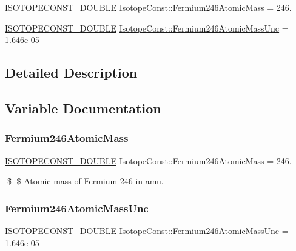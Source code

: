 \begin{DoxyCompactItemize}
\item 
\mbox{\hyperlink{group___isotope_const-_macros_ga8f45a7272ce02c0b4c65c44636ed719a}{I\+S\+O\+T\+O\+P\+E\+C\+O\+N\+S\+T\+\_\+\+D\+O\+U\+B\+LE}} \mbox{\hyperlink{group___isotope_const-_fermium-_fm246_gafb4c63bd50282779a464d256ccf2061d}{Isotope\+Const\+::\+Fermium246\+Atomic\+Mass}} = 246.
\item 
\mbox{\hyperlink{group___isotope_const-_macros_ga8f45a7272ce02c0b4c65c44636ed719a}{I\+S\+O\+T\+O\+P\+E\+C\+O\+N\+S\+T\+\_\+\+D\+O\+U\+B\+LE}} \mbox{\hyperlink{group___isotope_const-_fermium-_fm246_ga0382e2a115c12821bbfb3b560b5b7089}{Isotope\+Const\+::\+Fermium246\+Atomic\+Mass\+Unc}} = 1.\+646e-\/05
\end{DoxyCompactItemize}


\subsection{Detailed Description}


\subsection{Variable Documentation}
\mbox{\label{group___isotope_const-_fermium-_fm246_gafb4c63bd50282779a464d256ccf2061d}} 
\subsubsection{\texorpdfstring{Fermium246\+Atomic\+Mass}{Fermium246AtomicMass}}
{\footnotesize\ttfamily \mbox{\hyperlink{group___isotope_const-_macros_ga8f45a7272ce02c0b4c65c44636ed719a}{I\+S\+O\+T\+O\+P\+E\+C\+O\+N\+S\+T\+\_\+\+D\+O\+U\+B\+LE}} Isotope\+Const\+::\+Fermium246\+Atomic\+Mass = 246.}

\$ \$ Atomic mass of Fermium-\/246 in amu. \mbox{\label{group___isotope_const-_fermium-_fm246_ga0382e2a115c12821bbfb3b560b5b7089}} 
\subsubsection{\texorpdfstring{Fermium246\+Atomic\+Mass\+Unc}{Fermium246AtomicMassUnc}}
{\footnotesize\ttfamily \mbox{\hyperlink{group___isotope_const-_macros_ga8f45a7272ce02c0b4c65c44636ed719a}{I\+S\+O\+T\+O\+P\+E\+C\+O\+N\+S\+T\+\_\+\+D\+O\+U\+B\+LE}} Isotope\+Const\+::\+Fermium246\+Atomic\+Mass\+Unc = 1.\+646e-\/05}

